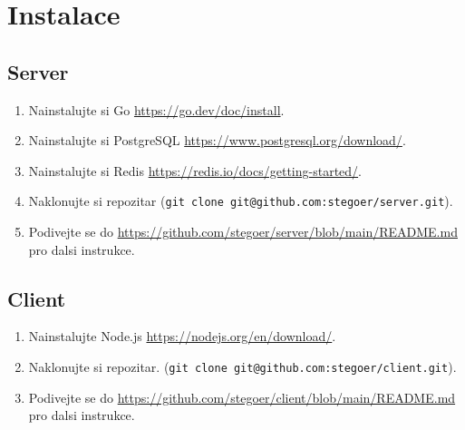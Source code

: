 
\section{Instalace}\label{sec:instalace}

\subsection{Server}\label{subsec:server}
\begin{enumerate}
    \item Nainstalujte si Go \url{https://go.dev/doc/install}.
    \item Nainstalujte si PostgreSQL \url{https://www.postgresql.org/download/}.
    \item Nainstalujte si Redis \url{https://redis.io/docs/getting-started/}.
    \item Naklonujte si repozitar (\texttt{git clone git@github.com:stegoer/server.git}).
    \item Podivejte se do \url{https://github.com/stegoer/server/blob/main/README.md} pro dalsi instrukce.
\end{enumerate}

\subsection{Client}\label{subsec:client}
\begin{enumerate}
    \item Nainstalujte Node.js \url{https://nodejs.org/en/download/}.
    \item Naklonujte si repozitar. (\texttt{git clone git@github.com:stegoer/client.git}).
    \item Podivejte se do \url{https://github.com/stegoer/client/blob/main/README.md} pro dalsi instrukce.
\end{enumerate}

